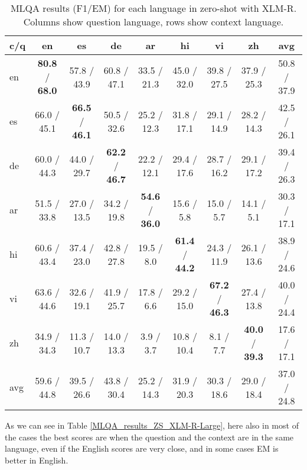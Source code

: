 \documentclass[11pt]{article}
\begin{document}
\begin{table*}[ht]
    \centering
    \begin{adjustbox}{max width=\textwidth}
    \begin{tabular}{l|ccccccc|c}
    \toprule
        c/q & en & es & de & ar & hi & vi & zh & avg \\ \midrule
        en & \textbf{80.8} / \textbf{68.0} & 57.8 / 43.9 & 60.8 / 47.1 & 33.5 / 21.3 & 45.0 / 32.0 & 39.8 / 27.5 & 37.9 / 25.3 & 50.8 / 37.9 \\ 
        es & 66.0 / 45.1 & \textbf{66.5} / \textbf{46.1} & 50.5 / 32.6 & 25.2 / 12.3 & 31.8 / 17.1 & 29.1 / 14.9 & 28.2 / 14.3 & 42.5 / 26.1 \\ 
        de & 60.0 / 44.3 & 44.0 / 29.7 & \textbf{62.2} / \textbf{46.7} & 22.2 / 12.1 & 29.4 / 17.6 & 28.7 / 16.2 & 29.1 / 17.2 & 39.4 / 26.3 \\ 
        ar & 51.5 / 33.8 & 27.0 / 13.5 & 34.2 / 19.8 & \textbf{54.6} / \textbf{36.0} & 15.6 / 5.8 & 15.0 / 5.7 & 14.1 / 5.1 & 30.3 / 17.1 \\ 
        hi & 60.6 / 43.4 & 37.4 / 23.0 & 42.8 / 27.8 & 19.5 / 8.0 & \textbf{61.4} / \textbf{44.2} & 24.3 / 11.9 & 26.1 / 13.6 & 38.9 / 24.6 \\ 
        vi & 63.6 / 44.6 & 32.6 / 19.1 & 41.9 / 25.7 & 17.8 / 6.6 & 29.2 / 15.0 & \textbf{67.2} / \textbf{46.3} & 27.4 / 13.8 & 40.0 / 24.4 \\ 
        zh & 34.9 / 34.3 & 11.3 / 10.7 & 14.0 / 13.3 & 3.9 / 3.7 & 10.8 / 10.4 & 8.1 / 7.7 & \textbf{40.0} / \textbf{39.3} & 17.6 / 17.1 \\ \midrule
        avg & 59.6 / 44.8 & 39.5 / 26.6 & 43.8 / 30.4 & 25.2 / 14.3 & 31.9 / 20.3 & 30.3 / 18.6 & 29.0 / 18.4 & 37.0 / 24.8 \\ \bottomrule
    \end{tabular}
    \end{adjustbox}
    \caption{MLQA results (F1/EM) for each language in zero-shot with XLM-R. Columns show question language, rows show context language.}
    \label{MLQA_results_ZS_XLM-R}
\end{table*}


As we can see in Table \ref{MLQA_results_ZS_XLM-R-Large}, here also in most of the cases the best scores are when the question and the context are in the same language, even if the English scores are very close, and in some cases EM is better in English.
\end{document}
